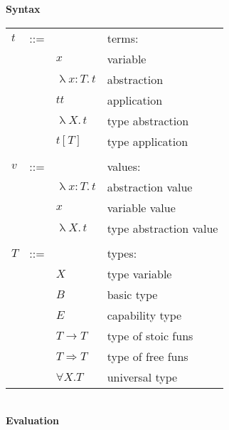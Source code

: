 \begin{figure}
\begin{framed}

\setlength{\columnseprule}{0.4pt}
\begin{multicols}{2}

\textbf{Syntax}

\begin{tabu} to \linewidth {l l l X[r]}
  $t$ & ::= &                                      & terms:               \\
      &     & $x$                                  & variable             \\
      &     & $\uplambda x{:}T. \, t$              & abstraction          \\
      &     & $t t$                                & application          \\
      &     & $\uplambda X. \, t$                  & type abstraction     \\
      &     & $t [T]$                              & type application     \\
\\
  $v$ & ::= &                    & values:              \\
      &     & $\uplambda x{:}T. \, t$ & abstraction value    \\
      &     & $x$                     & variable value       \\
      &     & $\uplambda X. \, t$     & type abstraction value  \\
\\
  $T$ & ::= &                       & types:               \\
      &     & $X$                   & type variable        \\
      &     & $B$                   & basic type           \\
      &     & $E$                   & capability type      \\
      &     & $T \to T$             & type of stoic funs   \\
      &     & \colorbox{shade}{$T \Rightarrow T$}     & type of free funs    \\
      &     & $\forall X.T$         & universal type       \\
\end{tabu}

\hfill\\

\textbf{Evaluation} \hfill {}


\end{multicols}
\end{framed}
\end{figure}
